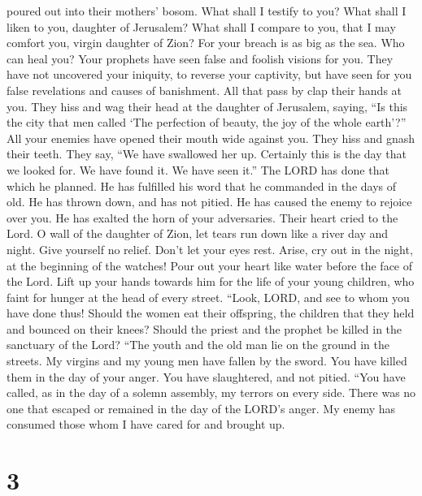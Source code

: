 poured out into their mothers' bosom.  What shall I testify
to you? What shall I liken to you, daughter of Jerusalem? What shall I
compare to you, that I may comfort you, virgin daughter of Zion? For
your breach is as big as the sea. Who can heal you?  Your
prophets have seen false and foolish visions for you. They have not
uncovered your iniquity, to reverse your captivity, but have seen for
you false revelations and causes of banishment.  All that
pass by clap their hands at you. They hiss and wag their head at the
daughter of Jerusalem, saying, ``Is this the city that men called `The
perfection of beauty, the joy of the whole earth'?''  All
your enemies have opened their mouth wide against you. They hiss and
gnash their teeth. They say, ``We have swallowed her up. Certainly this
is the day that we looked for. We have found it. We have seen it.''
 The LORD has done that which he planned. He has fulfilled
his word that he commanded in the days of old. He has thrown down, and
has not pitied. He has caused the enemy to rejoice over you. He has
exalted the horn of your adversaries.  Their heart cried to
the Lord. O wall of the daughter of Zion, let tears run down like a
river day and night. Give yourself no relief. Don't let your eyes rest.
 Arise, cry out in the night, at the beginning of the
watches! Pour out your heart like water before the face of the Lord.
Lift up your hands towards him for the life of your young children, who
faint for hunger at the head of every street.  ``Look,
LORD, and see to whom you have done thus! Should the women eat their
offspring, the children that they held and bounced on their knees?
Should the priest and the prophet be killed in the sanctuary of the
Lord?  ``The youth and the old man lie on the ground in the
streets. My virgins and my young men have fallen by the sword. You have
killed them in the day of your anger. You have slaughtered, and not
pitied.  ``You have called, as in the day of a solemn
assembly, my terrors on every side. There was no one that escaped or
remained in the day of the LORD's anger. My enemy has consumed those
whom I have cared for and brought up.

\hypertarget{section-2}{%
\section{3}\label{section-2}}

